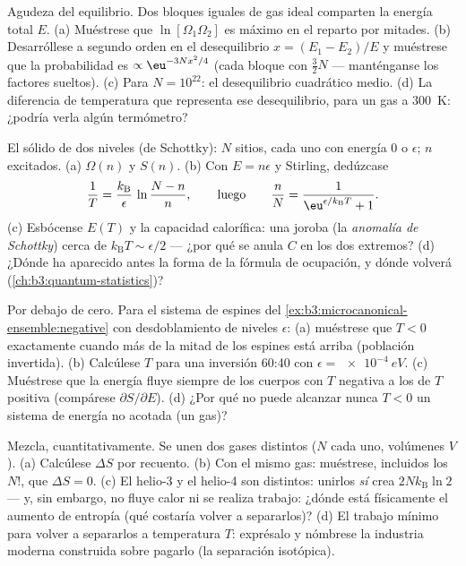 \begin{exercise}[$\star\star$]\label{exo:b3:microcanonical-ensemble:7}
Agudeza del equilibrio. Dos bloques iguales de gas ideal comparten la
energía total $E$. (a) Muéstrese que $\ln[\Omega_1\Omega_2]$ es máximo en el
reparto por mitades. (b) Desarróllese a segundo orden en el desequilibrio $x =
(E_1 - E_2)/E$ y muéstrese que la probabilidad es
$\propto\eu^{-3Nx^2/4}$ (cada bloque con $\tfrac32 N$  --- manténganse los factores sueltos). (c) Para $N = 10^{22}$: el
desequilibrio cuadrático medio. (d) La diferencia de temperatura que
representa ese desequilibrio, para un gas a \qty{300}{K}: ¿podría verla
algún termómetro?
\end{exercise}

\begin{exercise}[$\star\star$]\label{exo:b3:microcanonical-ensemble:8}
El sólido de dos niveles (de Schottky): $N$ sitios, cada uno con energía $0$
o $\epsilon$; $n$ excitados. (a) $\Omega(n)$ y $S(n)$. (b) Con $E =
n\epsilon$ y Stirling, dedúzcase
\[
\frac1T = \frac{k_{\text{B}}}{\epsilon}\,
\ln\frac{N - n}{n} ,
\qquad\text{luego}\qquad
\frac nN = \frac{1}{\eu^{\epsilon/k_{\text{B}}T} + 1} .
\]
(c) Esbócense $E(T)$ y la capacidad calorífica: una joroba (la
\emph{anomalía de Schottky}) cerca de $k_{\text{B}}T \sim \epsilon/2$ ---
¿por qué se anula $C$ en los dos extremos? (d) ¿Dónde ha aparecido antes la
forma de la fórmula de ocupación, y dónde volverá
(\cref{ch:b3:quantum-statistics})?
\end{exercise}

\begin{exercise}[$\star\star$]\label{exo:b3:microcanonical-ensemble:9}
Por debajo de cero. Para el sistema de espines del
\cref{ex:b3:microcanonical-ensemble:negative} con desdoblamiento de niveles
$\epsilon$: (a) muéstrese que $T < 0$ exactamente cuando más de la mitad de
los espines está arriba (población invertida). (b) Calcúlese $T$ para una
inversión 60:40 con $\epsilon = \qty{e-4}{eV}$. (c) Muéstrese que la energía
fluye siempre de los cuerpos con $T$ negativa a los de $T$ positiva
(compárese $\partial
S/\partial E$). (d) ¿Por qué no puede alcanzar nunca $T < 0$ un
sistema de energía no acotada (un gas)?
\end{exercise}

\begin{exercise}[$\star\star\star$]\label{exo:b3:microcanonical-ensemble:10}
Mezcla, cuantitativamente. Se unen dos gases distintos ($N$ cada uno,
volúmenes $V$). (a) Calcúlese $\Delta S$ por recuento. (b) Con el mismo gas:
muéstrese, incluidos los $N!$, que $\Delta S = 0$. (c) El helio-3 y el
helio-4 son distintos: unirlos \emph{sí} crea $2Nk_{\text{B}}\ln2$
--- y, sin embargo, no fluye calor ni se realiza trabajo: ¿dónde está
físicamente el aumento de entropía (qué costaría volver a separarlos)? (d)
El trabajo mínimo para volver a separarlos a temperatura $T$: exprésalo y
nómbrese la industria moderna construida sobre pagarlo (la separación
isotópica).
\end{exercise}

